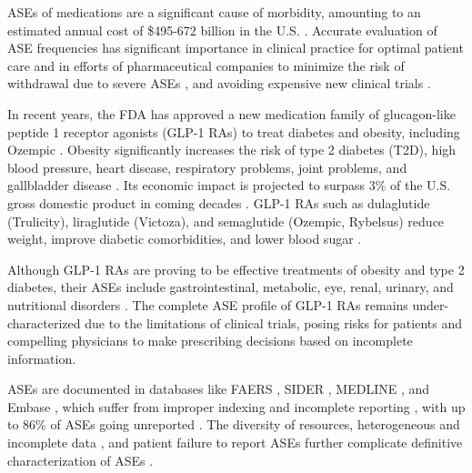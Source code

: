 \documentclass[referee,bst/sn-basic]{sn-jnl}%
\theoremstyle{thmstyletwo}%
\theoremstyle{thmstylethree}%
\begin{document}
ASEs of medications are a significant cause of morbidity, amounting to an estimated annual cost of \$495-672 billion in the U.S. \cite{watanabe2018cost}.
Accurate evaluation of ASE frequencies has significant importance in clinical practice for optimal patient care and in efforts of pharmaceutical companies to minimize the risk of withdrawal due to severe ASEs \cite{gao2022does}, and avoiding expensive new clinical trials  \cite{martin2017much}.

In recent years, the FDA has approved a new medication family of glucagon-like peptide 1 receptor agonists (GLP-1 RAs) to treat diabetes and obesity, including Ozempic \cite{novo-nordisk-ozempic-2017}.
Obesity significantly increases the risk of type 2 diabetes (T2D), high blood pressure, heart disease, respiratory problems, joint problems, and gallbladder disease \cite{cdc_diabetes, pearson2022variations}.
Its economic impact is projected to surpass 3\% of the U.S. gross domestic product in coming decades \cite{okunogbe2022economic}.
GLP-1 RAs such as dulaglutide (Trulicity), liraglutide (Victoza), and semaglutide (Ozempic, Rybelsus) reduce weight, improve diabetic comorbidities, and lower blood sugar \cite{moore2023glp}. 

Although GLP-1 RAs are proving to be effective treatments of obesity and type
2 diabetes, their ASEs include gastrointestinal, metabolic, eye, renal, urinary, and nutritional disorders \cite{zhang2023glp}. 
The complete ASE profile of GLP-1 RAs remains under-characterized due to the limitations of clinical trials, posing risks for patients and compelling physicians to make prescribing decisions based on incomplete information.

ASEs are documented in databases like FAERS \cite{fda-faers-2023}, SIDER \cite{kuhn2016sider}, MEDLINE \cite{ding2001mining}, and Embase \cite{elsevier-embase-2023}, which suffer from improper indexing \cite{derry2001incomplete} and incomplete reporting \cite{nugent2016computational}, with up to 86\% of ASEs going unreported \cite{nugent2016computational}. 
The diversity of resources, heterogeneous and incomplete data \cite{nugent2016computational}, and patient failure to report ASEs \cite{foster2008use} further complicate definitive characterization of ASEs \cite{nugent2016computational}.
\end{document}
